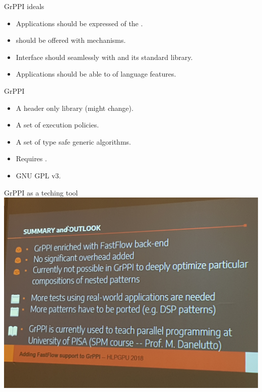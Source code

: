 \begin{frame}[t]{GrPPI ideals}
\begin{itemize}[<+->]
  \item Applications should be expressed  of the
        .
  \vfill
  \item {} should be offered with 
        mechanisms.
  \vfill
  \item Interface should  seamlessly with  and
        its standard library.
  \vfill
  \item Applications should be able to  of  language features.
\end{itemize}
\end{frame}

\begin{frame}[t]{GrPPI}
\begin{Large}
\end{Large}
\vfill\pause
\begin{itemize}
  \item A header only library (might change).
  \item A set of execution policies.
  \item A set of type safe generic algorithms.
  \item Requires .
  \item GNU GPL v3.
\end{itemize}
\end{frame}

\begin{frame}[t]{GrPPI as a teching tool}
\includegraphics[width=\textwidth]{img/grppi-upi.jpg}
\end{frame}


